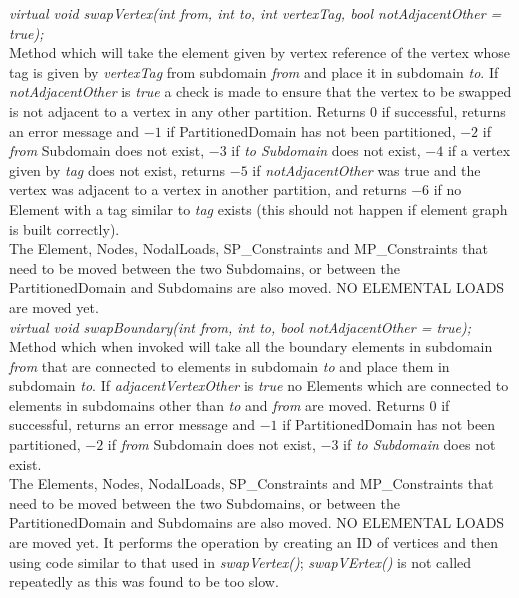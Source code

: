 {\em virtual void swapVertex(int from, int to, int vertexTag, bool
notAdjacentOther = true); } \\ 
Method which will take the element given by vertex reference of the
vertex whose tag is given by {\em vertexTag} from subdomain {\em from}
and place it in subdomain {\em to}. If {\em notAdjacentOther} is {\em
true} a check is made to ensure that the vertex to be swapped is not
adjacent to a vertex in any other partition. Returns $0$ if
successful, returns an error message and $-1$ if PartitionedDomain
has not been partitioned, $-2$ if {\em from} Subdomain does not exist,
$-3$ if {\em to Subdomain} does not exist, $-4$ if a vertex given by
{\em tag} does not exist, returns $-5$ if {\em notAdjacentOther} was
true and the vertex was adjacent to a vertex in another partition, and
returns $-6$ if no Element with a tag similar to {\em tag} exists
(this should not happen if element graph is built correctly). \\
The Element, Nodes, NodalLoads, SP\_Constraints and MP\_Constraints
that need to be moved between the two Subdomains, or between the
PartitionedDomain and Subdomains are also moved. NO ELEMENTAL LOADS 
are moved yet. \\


{\em virtual void swapBoundary(int from, int to, bool notAdjacentOther
= true); } \\ 
Method which when invoked will take all the boundary elements in
subdomain {\em from} that are connected to elements in subdomain {\em
to} and place them in subdomain {\em to}. If {\em adjacentVertexOther} is
{\em true} no Elements which are connected to elements in subdomains other 
than {\em to} and {\em from} are moved. Returns $0$ if successful, returns 
an error message and $-1$ if PartitionedDomain has not been partitioned, $-2$ 
if {\em from} Subdomain does not exist, $-3$ if {\em to Subdomain}
does not exist. \\ The Elements, Nodes, NodalLoads, SP\_Constraints
and MP\_Constraints that need to be moved between the two Subdomains,
or between the PartitionedDomain and Subdomains are also moved. NO
ELEMENTAL LOADS are moved yet. It performs the operation by creating
an ID of vertices and then using code similar to that used in {\em
swapVertex()}; {\em swapVErtex()} is not called repeatedly as this was
found to be too slow. \\ 

